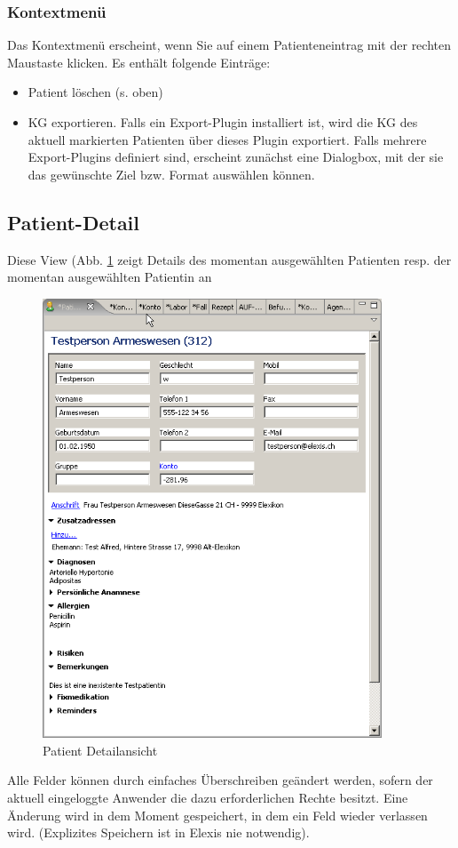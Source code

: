 \subsubsection{Kontextmenü}
Das Kontextmenü erscheint, wenn Sie auf einem Pa\-tien\-ten\-eintrag mit der rech\-ten
Maus\-taste klicken. Es enthält fol\-gende Ein\-träge:
\begin{itemize}
  \item Patient löschen (s. oben)
  \item KG exportieren. Falls ein Export-Plugin installiert ist, wird die KG des
  aktuell markierten Patienten über dieses Plugin exportiert. Falls mehrere
  Export-Plugins definiert sind, erscheint zunächst eine Dialogbox, mit der sie
  das ge\-wünschte Ziel bzw. Format auswählen können.
\end{itemize}


\subsection{Patient-Detail}
Diese View (Abb. \ref{fig:patdetail} zeigt Details des momentan ausgewählten
Patienten resp. der momentan ausgewählten Patientin an
\begin{figure}[htp]
\begin{center}
  \includegraphics[width=0.9\textwidth]{images/patdetail}
  \caption{Patient Detailansicht}
  \label{fig:patdetail}
\end{center}
\end{figure}
Alle Felder können durch einfaches Überschreiben geändert werden, sofern der
aktuell eingeloggte Anwender die dazu erforderlichen Rechte besitzt. Eine
Änderung wird in dem Moment gespeichert, in dem ein Feld wieder verlassen wird.
(Explizites Speichern ist in Elexis nie notwendig).

